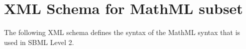 
\section{XML Schema for MathML subset}
\label{apdx:mathml-subset-schema}

The following XML schema defines the syntax of the MathML syntax
that is used in SBML Level 2.

\tightspacing
\begin{alltt}
\begin{footnotesize}

\end{footnotesize}
\end{alltt}
\regularspacing
